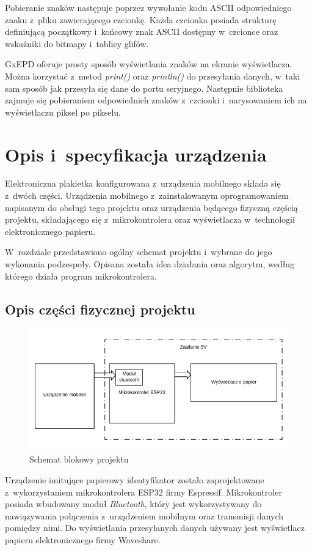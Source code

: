 \documentclass[a4paper,12pt, twoside]{article}
\begin{document}
        Pobieranie znaków następuje poprzez wywołanie kodu ASCII odpowiedniego znaku z~pliku zawierającego czcionkę. Każda czcionka posiada strukturę definiującą początkowy i~końcowy znak ASCII dostępny w~czcionce oraz wskaźniki do bitmapy i~tablicy glifów.
        
        GxEPD oferuje prosty sposób wyświetlania znaków na ekranie wyświetlacza. Można korzystać z~metod \textit{print()} oraz \textit{println()} do przesyłania danych, w~taki sam sposób jak przesyła się dane do portu seryjnego. Następnie biblioteka zajmuje się pobieraniem odpowiednich znaków z~czcionki i~narysowaniem ich na wyświetlaczu piksel po pikselu. 
        
        \newpage
    	\section{Opis i~specyfikacja urządzenia}
    	Elektroniczna plakietka konfigurowana z~urządzenia mobilnego składa się z~dwóch części. Urządzenia mobilnego z~zainstalowanym oprogramowaniem napisanym do obsługi tego projektu oraz urządzenia będącego fizyczną częścią projektu, składającego się z~mikrokontrolera oraz wyświetlacza w~technologii elektronicznego papieru.
    
        W~rozdziale przedstawiono ogólny schemat projektu i~wybrane do jego wykonania podzespoły. Opisana została idea działania oraz algorytm, według którego działa program mikrokontrolera.
        
        \subsection{Opis części fizycznej projektu}
        \begin{figure}[H]
    	        \centering
    			\includegraphics[width=12cm]{images/rys_7schemat_blokowy.png}
    			\caption{Schemat blokowy projektu}
                \label{fig:block}
    	\end{figure}
        Urządzenie imitujące papierowy identyfikator zostało zaprojektowane z~wykorzystaniem mikrokontrolera ESP32 firmy Espressif. Mikrokontroler posiada wbudowany moduł \textit{Bluetooth}, który jest wykorzystywany do nawiązywania połączenia z~urządzeniem mobilnym oraz transmisji danych pomiędzy nimi. Do wyświetlania przesyłanych danych używany jest wyświetlacz papieru elektronicznego firmy Waveshare.
        
\end{document}
